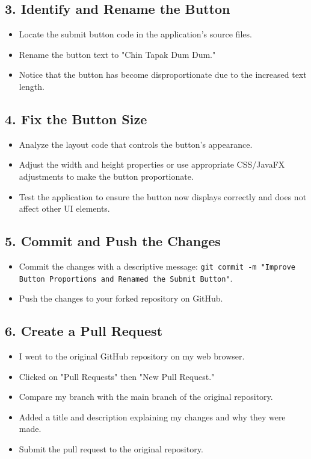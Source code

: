 \documentclass[a4paper,12pt]{article}
\begin{document}
\subsection*{3. Identify and Rename the Button}
\begin{itemize}
    \item Locate the submit button code in the application’s source files.
    \item Rename the button text to "Chin Tapak Dum Dum."
    \item Notice that the button has become disproportionate due to the increased text length.
\end{itemize}

\subsection*{4. Fix the Button Size}
\begin{itemize}
    \item Analyze the layout code that controls the button's appearance.
    \item Adjust the width and height properties or use appropriate CSS/JavaFX adjustments to make the button proportionate.
    \item Test the application to ensure the button now displays correctly and does not affect other UI elements.
\end{itemize}

\subsection*{5. Commit and Push the Changes}
\begin{itemize}
    \item Commit the changes with a descriptive message: \texttt{git commit -m "Improve Button Proportions and Renamed the Submit Button"}.
    \item Push the changes to your forked repository on GitHub.
\end{itemize}

\subsection*{6. Create a Pull Request}
\begin{itemize}
    \item I went to the original GitHub repository on my web browser.
    \item Clicked on "Pull Requests" then "New Pull Request."
    \item Compare my branch with the main branch of the original repository.
    \item Added a title and description explaining my changes and why they were made.
    \item Submit the pull request to the original repository.
\end{itemize}
\end{document}
